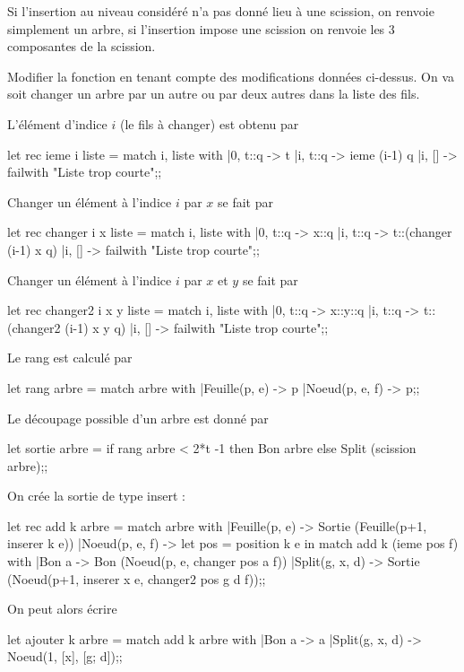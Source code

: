 Si l'insertion au niveau considéré n'a pas donné lieu à une scission, on renvoie simplement un arbre, si l'insertion impose une scission on renvoie les 3 composantes de la scission.
\begin{question}{}{}
Modifier la fonction  en tenant compte des modifications données ci-dessus.
\reponse
On va soit changer un arbre par un autre ou par deux autres dans la liste des fils.

L'élément d'indice $i$ (le fils à changer) est obtenu par

\begin{ocaml}
let rec ieme i liste =
   match i, liste with
   |0, t::q -> t
   |i, t::q -> ieme (i-1) q
   |i, [] -> failwith "Liste trop courte";;
\end{ocaml}

Changer un élément à l'indice $i$ par $x$ se fait par
\begin{ocaml}
let rec changer i x liste =  
   match i, liste with
   |0, t::q -> x::q
   |i, t::q -> t::(changer (i-1) x q)
   |i, [] -> failwith "Liste trop courte";;
\end{ocaml}

Changer un élément à l'indice $i$ par $x$ et $y$ se fait par
\begin{ocaml}
let rec changer2 i x y liste =  
   match i, liste with
   |0, t::q -> x::y::q
   |i, t::q -> t::(changer2 (i-1) x y q)
   |i, [] -> failwith "Liste trop courte";;
\end{ocaml}

Le rang est calculé par 
\begin{ocaml}
let rang arbre = 
   match arbre with
   |Feuille(p, e) -> p
   |Noeud(p, e, f) -> p;;
\end{ocaml}

Le découpage possible d'un arbre est donné par 
\begin{ocaml}
let sortie arbre = 
   if rang arbre < 2*t -1
   then Bon arbre
   else Split (scission arbre);;
\end{ocaml}

On crée la sortie de type insert :
\begin{ocaml}
let rec add k arbre =
   match arbre with
   |Feuille(p, e) -> Sortie (Feuille(p+1, inserer k e))
   |Noeud(p, e, f) 
      -> let pos = position k e in
         match add k (ieme pos f) with
         |Bon a -> Bon (Noeud(p, e, changer pos a f))
         |Split(g, x, d) -> Sortie (Noeud(p+1, 
                                          inserer x e, 
                                          changer2 pos g d f));;
\end{ocaml}

On peut alors écrire
\begin{ocaml}
let ajouter k arbre =
   match add k arbre with
   |Bon a -> a
   |Split(g, x, d) -> Noeud(1, [x], [g; d]);;
\end{ocaml}
\end{question}
